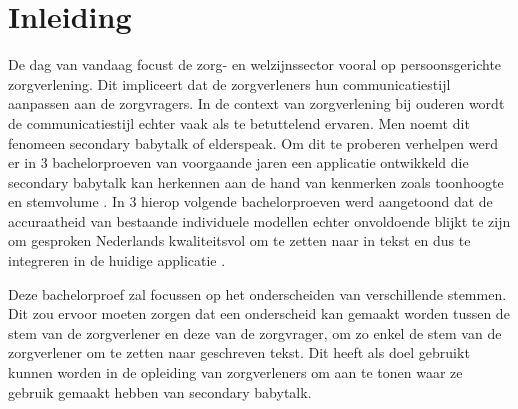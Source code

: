 


% 

\section{Inleiding}%
\label{sec:inleiding}

De dag van vandaag focust de zorg- en welzijnssector vooral op persoonsgerichte zorgverlening. Dit impliceert dat de zorgverleners hun communicatiestijl aanpassen aan de zorgvragers. In de context van zorgverlening bij ouderen wordt de communicatiestijl echter vaak als te betuttelend ervaren. Men noemt dit fenomeen secondary babytalk of elderspeak. Om dit te proberen verhelpen werd er in 3 bachelorproeven van voorgaande jaren een applicatie ontwikkeld die secondary babytalk kan herkennen aan de hand van kenmerken zoals toonhoogte en stemvolume \autocite{Govaerts2022,Gussem2022,Daems2023}. In 3 hierop volgende bachelorproeven werd aangetoond dat de accuraatheid van bestaande individuele modellen echter onvoldoende blijkt te zijn om gesproken Nederlands kwaliteitsvol om te zetten naar in tekst en dus te integreren in de huidige applicatie \autocite{Branden2024,Coetsiers2024,Schryver2024}.

Deze bachelorproef zal focussen op het onderscheiden van verschillende stemmen. Dit zou ervoor moeten zorgen dat een onderscheid kan gemaakt worden tussen de stem van de zorgverlener en deze van de zorgvrager, om zo enkel de stem van de zorgverlener om te zetten naar geschreven tekst. Dit heeft als doel gebruikt kunnen worden in de opleiding van zorgverleners om aan te tonen waar ze gebruik gemaakt hebben van secondary babytalk.


